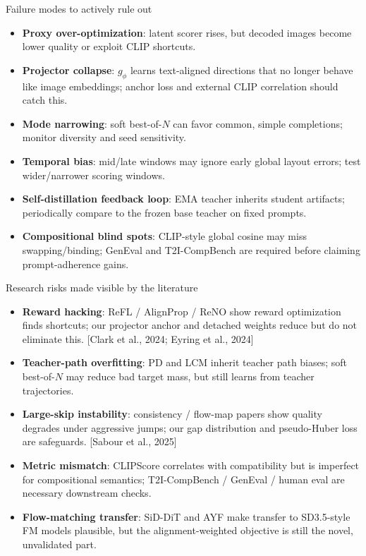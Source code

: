 \documentclass[aspectratio=169,10pt]{beamer}
\newcommand{\litref}[1]{{\scriptsize\color{black!55}[#1]}}
\begin{document}
\begin{frame}{Failure modes to actively rule out}
  \footnotesize
  \begin{itemize}
    \item \textbf{Proxy over-optimization}: latent scorer rises, but decoded
      images become lower quality or exploit CLIP shortcuts.
    \item \textbf{Projector collapse}: \(g_\phi\) learns text-aligned
      directions that no longer behave like image embeddings; anchor loss and
      external CLIP correlation should catch this.
    \item \textbf{Mode narrowing}: soft best-of-\(N\) can favor common, simple
      completions; monitor diversity and seed sensitivity.
    \item \textbf{Temporal bias}: mid/late windows may ignore early global
      layout errors; test wider/narrower scoring windows.
    \item \textbf{Self-distillation feedback loop}: EMA teacher inherits
      student artifacts; periodically compare to the frozen base teacher on
      fixed prompts.
    \item \textbf{Compositional blind spots}: CLIP-style global cosine may
      miss swapping/binding; GenEval and T2I-CompBench are required before
      claiming prompt-adherence gains.
  \end{itemize}
\end{frame}

\begin{frame}{Research risks made visible by the literature}
  \begin{itemize}
    \item \textbf{Reward hacking}: ReFL / AlignProp / ReNO show reward
      optimization finds shortcuts; our projector anchor and detached weights
      reduce but do not eliminate this. \litref{Clark et al., 2024; Eyring et al., 2024}
    \item \textbf{Teacher-path overfitting}: PD and LCM inherit teacher path
      biases; soft best-of-$N$ may reduce bad target mass, but still learns
      from teacher trajectories.
    \item \textbf{Large-skip instability}: consistency / flow-map papers show
      quality degrades under aggressive jumps; our gap distribution and
      pseudo-Huber loss are safeguards. \litref{Sabour et al., 2025}
    \item \textbf{Metric mismatch}: CLIPScore correlates with compatibility
      but is imperfect for compositional semantics; T2I-CompBench / GenEval /
      human eval are necessary downstream checks.
    \item \textbf{Flow-matching transfer}: SiD-DiT and AYF make transfer to
      SD3.5-style FM models plausible, but the alignment-weighted objective is
      still the novel, unvalidated part.
  \end{itemize}
\end{frame}
\end{document}
